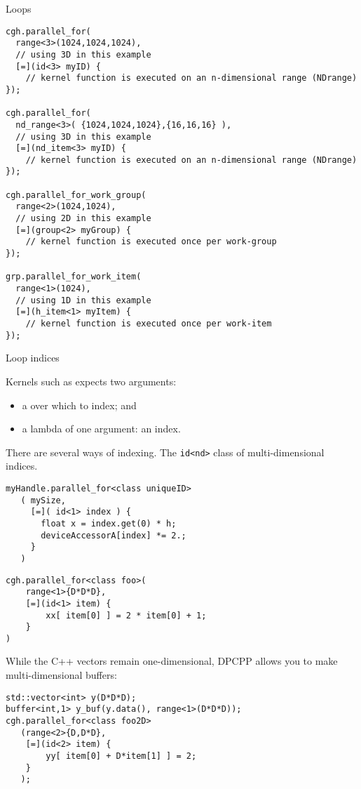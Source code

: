  {Loops}
  
\begin{lstlisting}
cgh.parallel_for(
  range<3>(1024,1024,1024),
  // using 3D in this example
  [=](id<3> myID) {
    // kernel function is executed on an n-dimensional range (NDrange)
});

cgh.parallel_for(
  nd_range<3>( {1024,1024,1024},{16,16,16} ),
  // using 3D in this example 
  [=](nd_item<3> myID) {
    // kernel function is executed on an n-dimensional range (NDrange)
});

cgh.parallel_for_work_group(
  range<2>(1024,1024),
  // using 2D in this example
  [=](group<2> myGroup) {
    // kernel function is executed once per work-group
});

grp.parallel_for_work_item(
  range<1>(1024),
  // using 1D in this example
  [=](h_item<1> myItem) {
    // kernel function is executed once per work-item
});
\end{lstlisting}

 {Loop indices}

Kernels such as 
expects two arguments:
\begin{itemize}
\item a  over which to index; and
\item a lambda of one argument: an index.
\end{itemize}

There are several ways of indexing.
The \lstinline+id<nd>+ class of multi-dimensional indices.
\begin{lstlisting}
myHandle.parallel_for<class uniqueID>
   ( mySize,
     [=]( id<1> index ) {
       float x = index.get(0) * h;
       deviceAccessorA[index] *= 2.;
     }
   )
\end{lstlisting}

\begin{lstlisting}
cgh.parallel_for<class foo>(
    range<1>{D*D*D},
    [=](id<1> item) {
        xx[ item[0] ] = 2 * item[0] + 1;
    }
)
\end{lstlisting}

While the C++ vectors remain one-dimensional,
\ac{DPCPP} allows you to make multi-dimensional buffers:
\begin{lstlisting}
std::vector<int> y(D*D*D);
buffer<int,1> y_buf(y.data(), range<1>(D*D*D));
cgh.parallel_for<class foo2D>
   (range<2>{D,D*D},
    [=](id<2> item) {
        yy[ item[0] + D*item[1] ] = 2;
    }
   );
\end{lstlisting}

